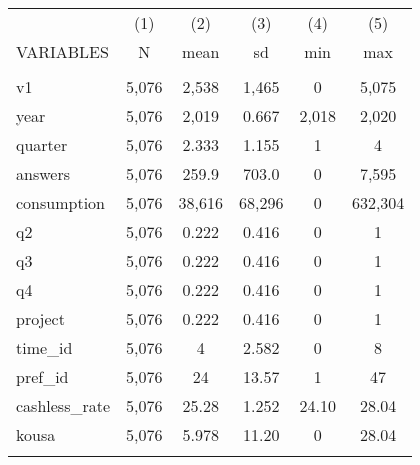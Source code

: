 \documentclass[]{article}
\begin{document}
\begin{tabular}{lccccc} \hline
 & (1) & (2) & (3) & (4) & (5) \\
VARIABLES & N & mean & sd & min & max \\ \hline
 &  &  &  &  &  \\
v1 & 5,076 & 2,538 & 1,465 & 0 & 5,075 \\
year & 5,076 & 2,019 & 0.667 & 2,018 & 2,020 \\
quarter & 5,076 & 2.333 & 1.155 & 1 & 4 \\
answers & 5,076 & 259.9 & 703.0 & 0 & 7,595 \\
consumption & 5,076 & 38,616 & 68,296 & 0 & 632,304 \\
q2 & 5,076 & 0.222 & 0.416 & 0 & 1 \\
q3 & 5,076 & 0.222 & 0.416 & 0 & 1 \\
q4 & 5,076 & 0.222 & 0.416 & 0 & 1 \\
project & 5,076 & 0.222 & 0.416 & 0 & 1 \\
time\_id & 5,076 & 4 & 2.582 & 0 & 8 \\
pref\_id & 5,076 & 24 & 13.57 & 1 & 47 \\
cashless\_rate & 5,076 & 25.28 & 1.252 & 24.10 & 28.04 \\
kousa & 5,076 & 5.978 & 11.20 & 0 & 28.04 \\
 &  &  &  &  &  \\ \hline
\end{tabular}
\end{document}
